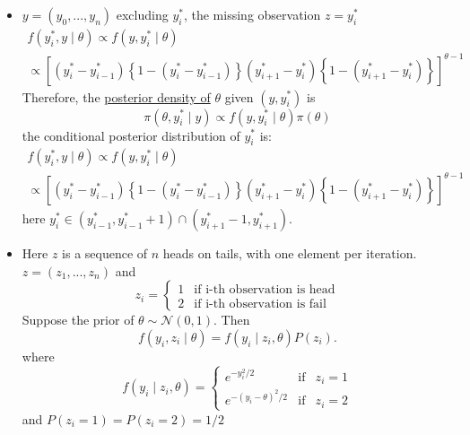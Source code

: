 \documentclass[lecture,12pt,]{pcms-l}
\numberwithin{section}{chapter}
\numberwithin{equation}{chapter}
\theoremstyle{plain}
\theoremstyle{definition}
\theoremstyle{definition}
\begin{document}
\begin{itemize}
\item $y=(y_0,...,y_n)$ excluding $y_{i}^*$, the missing observation $z=y_{i}^*$
\begin{equation*}
\begin{split}
f(y_{i}^*,y \mid \theta) \propto f(y,y_{i}^* \mid \theta) 
\\
\propto \left [ (y_{i}^*-y_{i-1}^*)\left \{  1- (y_{i}^*-y_{i-1}^*) \right \} (y_{i+1}^*-y_{i}^*)\left \{  1- (y_{i+1}^*-y_{i}^*) \right \}\right ]^{\theta-1}
\end{split}
\end{equation*}
Therefore, the \underline{posterior density of} $\theta$ given $(y,y_{i}^*)$ is 
\begin{equation*}
\pi(\theta,y_{i}^*\mid y) \propto f(y,y_{i}^* \mid \theta)\pi(\theta)
\end{equation*}
the conditional posterior distribution of $y_{i}^*$ is:
\begin{equation*}
\begin{split}
f(y_{i}^*,y \mid \theta) \propto f(y,y_{i}^* \mid \theta) 
\\
\propto \left [ (y_{i}^*-y_{i-1}^*)\left \{  1- (y_{i}^*-y_{i-1}^*) \right \} (y_{i+1}^*-y_{i}^*)\left \{  1- (y_{i+1}^*-y_{i}^*) \right \}\right ]^{\theta-1}
\end{split}
\end{equation*}
here $y_{i}^* \in (y_{i-1}^*,y_{i-1}^*+1)\cap (y_{i+1}^*-1,y_{i+1}^*) $.
\item Here $z$ is a sequence of $n$ heads on tails, with one element per iteration. $z=(z_1,...,z_n)$ and
\begin{equation*}
z_i=\left\{\begin{matrix}
1 & \text{if i-th observation is head} \\
2 &  \text{if i-th observation is fail} 
\end{matrix}\right.
\end{equation*}
Suppose the prior of $\theta \sim \mathcal{N}(0,1)$. Then
\begin{equation*}
f(y_i,z_i \mid \theta)=f(y_i \mid z_i, \theta)P(z_i).
\end{equation*}
where
\begin{equation*}
f(y_i \mid z_i, \theta)=\left\{\begin{matrix}
e^{-y_{i}^2/2} & \text{if} & z_i=1 \\
e^{-(y_{i}-\theta)^2/2} & \text{if} & z_i=2 
\end{matrix}\right.
\end{equation*}
and $P(z_i=1)=P(z_i=2)=1/2$


\end{itemize}
\end{document}
